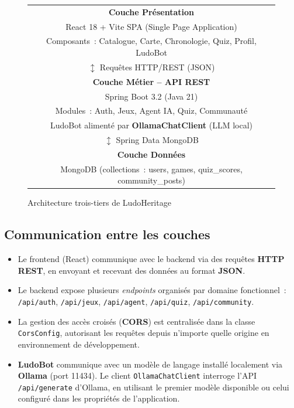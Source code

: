 \begin{figure}[H]
\centering
\renewcommand{\arraystretch}{2}
\begin{tabular}{|c|}
\hline
\textbf{Couche Présentation} \\
React 18 + Vite \quad \textbullet{} \quad SPA (Single Page Application) \\
Composants~: Catalogue, Carte, Chronologie, Quiz, Profil, LudoBot \\
\hline
$\updownarrow$ \quad Requêtes HTTP/REST (JSON) \\
\hline
\textbf{Couche Métier -- API REST} \\
Spring Boot 3.2 (Java 21) \\
Modules~: Auth, Jeux, Agent IA, Quiz, Communauté \\
LudoBot alimenté par \textbf{OllamaChatClient} (LLM local) \\
\hline
$\updownarrow$ \quad Spring Data MongoDB \\
\hline
\textbf{Couche Données} \\
MongoDB (collections~: users, games, quiz\_scores, community\_posts) \\
\hline
\end{tabular}
\caption{Architecture trois-tiers de LudoHeritage}
\label{fig:architecture}
\end{figure}

\subsection{Communication entre les couches}

\begin{itemize}
    \item Le frontend (React) communique avec le backend via des requêtes \textbf{HTTP REST},
          en envoyant et recevant des données au format \textbf{JSON}.

    \item Le backend expose plusieurs \textit{endpoints} organisés par domaine fonctionnel~:
          \texttt{/api/auth}, \texttt{/api/jeux}, \texttt{/api/agent}, \texttt{/api/quiz},
          \texttt{/api/community}.

    \item La gestion des accès croisés (\textbf{CORS}) est centralisée dans la classe
          \texttt{CorsConfig}, autorisant les requêtes depuis n'importe quelle origine en
          environnement de développement.

    \item \textbf{LudoBot} communique avec un modèle de langage installé localement via
          \textbf{Ollama} (port 11434). Le client \texttt{OllamaChatClient} interroge l'API
          \texttt{/api/generate} d'Ollama, en utilisant le premier modèle disponible ou celui
          configuré dans les propriétés de l'application.
\end{itemize}

